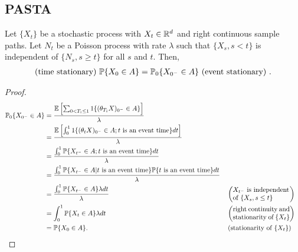 \documentclass[all-lectures.tex]{subfiles}
\begin{document}
\subsection{PASTA}
\begin{thm}
Let $\{X_t\}$ be a stochastic process with $X_t \in \R^d$ and right continuous sample paths. Let $N_t$ be a Poisson process with rate $\lambda$ such that $\{X_s,s<t\}$ is independent of $\{N_s, s \geq t\}$ for all $s$ and $t$. Then, 
\begin{align*}
\text{(time stationary) }\P\{X_0 \in A\} = \P_0\{ X_{0^-} \in A\} \text{ (event stationary) }.
\end{align*}
\begin{proof}
\begin{align*}
\P_0\{ X_{0^-} \in A\}  &= \frac{\E\left[ \sum_{0 < T_i \leq 1} 1\{(\theta_{T_i} X)_{0^-} \in A\} \right]}{\lambda} \\
&= \frac{\E\left[ \int_0^1 1\{(\theta_t X)_{0^-} \in A; t \text{ is an event time}\} dt\right]}{\lambda} \\
&= \frac{\int_0^1 \P\{X_{t^-} \in A; t \text{ is an event time}\}dt}{\lambda} \\
&= \frac{\int_0^1 \P\{X_{t^-} \in A| t \text{ is an event time}\} \P\{ t \text{ is an event time}\}dt} {\lambda} \\
&= \frac{\int_0^1 \P\{X_{t^-} \in A\} \lambda dt} {\lambda} && \left(\parbox{3cm}{$X_{t^-}$ is independent \\ of $\{X_s, s\leq t\}$} \right)\\
&= \int_0^1 \P\{ X_{t} \in A\} \lambda dt && \left(\parbox{3cm}{right continuity and \\ stationarity of $\{X_t\}$} \right)  \\
&= \P\{X_{0} \in A\}. && \left(\text{stationarity of $\{X_t\}$}\right) \qedhere
\end{align*}
\end{proof}
\end{thm}
\end{document}
